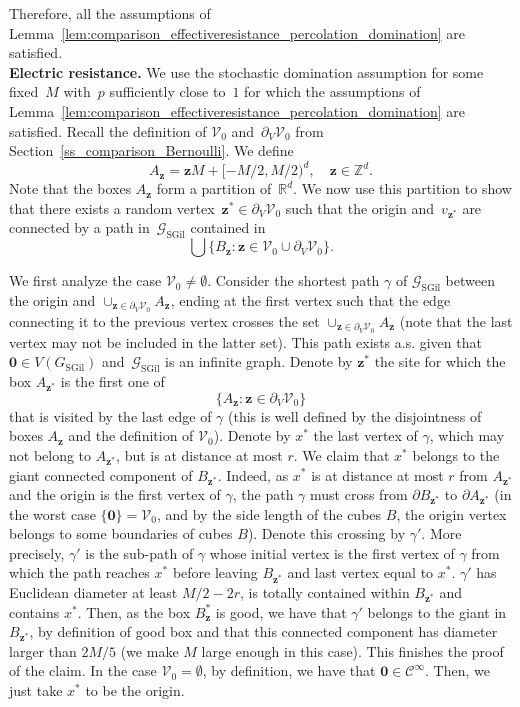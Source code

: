 \documentclass[a4paper,11pt]{article}
\newcommand{\RR}{\mathbb{R}}
\newcommand{\ZZ}{\mathbb{Z}}
\theoremstyle{definition}
\begin{document}
Therefore, all the assumptions of Lemma~\ref{lem:comparison_effectiveresistance_percolation_domination} are satisfied. \\

\noindent \textbf{Electric resistance.} We use the stochastic domination assumption for some fixed~$M$ with~$p$ sufficiently close to~$1$ for which the assumptions of Lemma~\ref{lem:comparison_effectiveresistance_percolation_domination} are satisfied. Recall the definition of $\mathcal V_0$ and~$\partial_V\mathcal V_0$ from Section~\ref{ss_comparison_Bernoulli}. We define
$$ A_{\mathbf{z}}=\mathbf{z} M + [-M/2,M/2)^d, \quad \mathbf z \in \ZZ^d.$$
Note that the boxes $A_{\mathbf z}$ form a partition of~$\RR^d$. We now use this partition to show that there exists a random vertex~$\mathbf z^\ast \in \partial_V\mathcal V_0$ such that the origin and~$v_{\mathbf z^\ast}$ are connected by a path in~$\mathcal G_\mathrm{SGil}$ contained in
$$\bigcup \{B_\mathbf{z}: \mathbf{z} \in \mathcal V_0 \cup \partial_V\mathcal V_0 \}.$$

We first analyze the case $\mathcal{V}_0\ne \emptyset$. Consider the shortest path $\gamma$ of $\mathcal G_\mathrm{SGil}$ between the origin and $\cup_{\mathbf z \in\partial_V \mathcal V_0} A_{\mathbf z}$, ending at the first vertex such that the edge connecting it to the previous vertex crosses the set $\cup_{\mathbf z \in\partial_V \mathcal V_0} A_{\mathbf z}$ (note that the last vertex may not be included in the latter set). This path exists a.s. given that $\mathbf 0 \in V(G_\mathrm{SGil})$ and~$\mathcal G_\mathrm{SGil}$ is an infinite graph. Denote by $\mathbf{z}^*$ the site for which the box $A_{\mathbf z^*}$ is the first one of $$\{A_{\mathbf z}:\mathbf{z}\in \partial_V \mathcal V_0 \}$$ that is visited by the last edge of $\gamma$ (this is well defined by the disjointness of boxes $A_{\mathbf z}$ and the definition of $\mathcal V_0$). Denote by $x^*$ the last vertex of $\gamma$, which may not belong to $A_{\mathbf z^*}$, but is at distance at most $r$. We claim that $x^*$ belongs to the giant connected component of $B_{\mathbf{z}^*}$. Indeed, as $x^*$ is at distance at most $r$ from $ A_{\mathbf z^*}$ and the origin is the first vertex of $\gamma$, the path $\gamma$ must cross from $\partial B_{\mathbf z^*}$ to $\partial A_{\mathbf z^*}$ (in the worst case $\{\mathbf 0\} = \mathcal V_0$, and by the side length of the cubes $B$, the origin vertex belongs to some boundaries of cubes $B$). Denote this crossing by $\gamma'$. More precisely, $\gamma'$ is the sub-path of $\gamma$ whose initial vertex is the first vertex of $\gamma$ from which the path reaches $x^*$ before leaving $B_{\mathbf z^*}$ and last vertex equal to $x^*$. $\gamma'$ has Euclidean diameter at least $M/2-2r$, is totally contained within $B_{\mathbf z^*}$ and contains $x^*$. Then, as the box $B_{\mathbf z}^*$ is good, we have that $\gamma'$ belongs to the giant in $B_{\mathbf z^*}$, by definition of good box and that this connected component has diameter larger than $2M/5$ (we make $M$ large enough in this case). This finishes the proof of the claim. In the case $\mathcal V_0=\emptyset$, by definition, we have that $\mathbf{0} \in \mathcal C^{\infty}$. Then, we just take $x^*$ to be the origin. 
\end{document}
